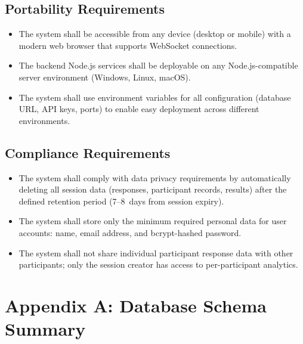 \documentclass[12pt,a4paper]{article}
\begin{document}
\subsection{Portability Requirements}
\begin{itemize}
  \item The system shall be accessible from any device (desktop or mobile) with a
        modern web browser that supports WebSocket connections.
  \item The backend Node.js services shall be deployable on any Node.js-compatible
        server environment (Windows, Linux, macOS).
  \item The system shall use environment variables for all configuration (database
        URL, API keys, ports) to enable easy deployment across different environments.
\end{itemize}

\subsection{Compliance Requirements}
\begin{itemize}
  \item The system shall comply with data privacy requirements by automatically
        deleting all session data (responses, participant records, results) after the
        defined retention period (7--8~days from session expiry).
  \item The system shall store only the minimum required personal data for user
        accounts: name, email address, and bcrypt-hashed password.
  \item The system shall not share individual participant response data with other
        participants; only the session creator has access to per-participant analytics.
\end{itemize}

\newpage
\appendix
\section*{Appendix A: Database Schema Summary}
\end{document}
